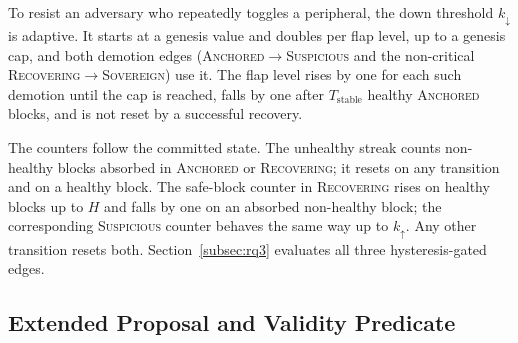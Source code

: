 To resist an adversary who repeatedly toggles a peripheral, the down
threshold $k_{\downarrow}$ is adaptive. It starts at a genesis value and
doubles per flap level, up to a genesis cap, and both demotion edges
(\textsc{Anchored}$\to$\textsc{Suspicious} and the non-critical
\textsc{Recovering}$\to$\textsc{Sovereign}) use it. The flap level rises by
one for each such demotion until the cap is reached, falls by one after
$T_{\text{stable}}$ healthy \textsc{Anchored} blocks, and is not reset by a
successful recovery.

The counters follow the committed state. The unhealthy streak counts
non-healthy blocks absorbed in \textsc{Anchored} or \textsc{Recovering}; it
resets on any transition and on a healthy block. The safe-block counter in
\textsc{Recovering} rises on healthy blocks up to $H$ and falls by one on an
absorbed non-healthy block; the corresponding \textsc{Suspicious} counter
behaves the same way up to $k_{\uparrow}$. Any other transition resets both.
Section~\ref{subsec:rq3} evaluates all three hysteresis-gated edges.

\subsection{Extended Proposal and Validity Predicate}
\label{subsec:proposal}

